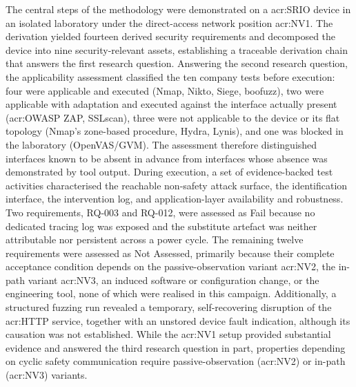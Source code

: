 The central steps of the methodology were demonstrated on a \acrfull{acr:SRIO} device in an isolated laboratory under the direct-access network position \gls{acr:NV1}. The derivation yielded fourteen derived security requirements and decomposed the device into nine security-relevant assets, establishing a traceable derivation chain that answers the first research question. Answering the second research question, the applicability assessment classified the ten company tests before execution: four were applicable and executed (Nmap, Nikto, Siege, boofuzz), two were applicable with adaptation and executed against the interface actually present (\gls{acr:OWASP} ZAP, SSLscan), three were not applicable to the device or its flat topology (Nmap's zone-based procedure, Hydra, Lynis), and one was blocked in the laboratory (OpenVAS/GVM). The assessment therefore distinguished interfaces known to be absent in advance from interfaces whose absence was demonstrated by tool output. During execution, a set of evidence-backed test activities characterised the reachable non-safety attack surface, the identification interface, the intervention log, and application-layer availability and robustness. Two requirements, RQ-003 and RQ-012, were assessed as Fail because no dedicated tracing log was exposed and the substitute artefact was neither attributable nor persistent across a power cycle. The remaining twelve requirements were assessed as Not Assessed, primarily because their complete acceptance condition depends on the passive-observation variant \gls{acr:NV2}, the in-path variant \gls{acr:NV3}, an induced software or configuration change, or the engineering tool, none of which were realised in this campaign. Additionally, a structured fuzzing run revealed a temporary, self-recovering disruption of the \gls{acr:HTTP} service, together with an unstored device fault indication, although its causation was not established. While the \gls{acr:NV1} setup provided substantial evidence and answered the third research question in part, properties depending on cyclic safety communication require passive-observation (\gls{acr:NV2}) or in-path (\gls{acr:NV3}) variants.

